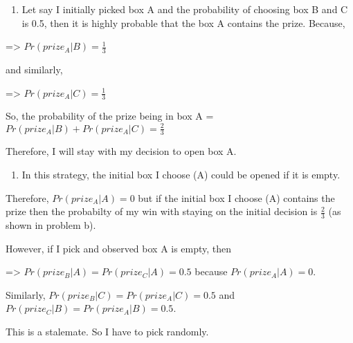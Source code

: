 \documentclass[11pt]{article}
\providecommand{\tightlist}{%
      \setlength{\itemsep}{0pt}\setlength{\parskip}{0pt}}
\begin{document}
\newpage
\begin{enumerate}
\def\labelenumi{\alph{enumi})}
\setcounter{enumi}{1}
\tightlist
\item
  Let say I initially picked box A and the probability of choosing box B
  and C is 0.5, then it is highly probable that the box A contains the
  prize. Because,
\end{enumerate}

=\textgreater{} \(Pr (prize_A | B) = \frac{1}{3}\)

and similarly,

=\textgreater{} \(Pr (prize_A | C) = \frac{1}{3}\)

So, the probability of the prize being in box A =
\(Pr (prize_A | B) + Pr (prize_A | C) = \frac{2}{3}\)

Therefore, I will stay with my decision to open box A.

\begin{enumerate}
\def\labelenumi{\alph{enumi})}
\setcounter{enumi}{2}
\tightlist
\item
  In this strategy, the initial box I choose (A) could be opened if it
  is empty.
\end{enumerate}

Therefore, \(Pr (prize_A | A) = 0\) but if the initial box I choose (A)
contains the prize then the probabilty of my win with staying on the
initial decision is \(\frac{2}{3}\) (as shown in problem b).

However, if I pick and observed box A is empty, then

=\textgreater{} \(Pr (prize_B | A) = Pr (prize_C | A) = 0.5\) because
\(Pr (prize_A | A) = 0\).

Similarly, \(Pr (prize_B | C) = Pr (prize_A | C) = 0.5\) and
\(Pr (prize_C | B) = Pr (prize_A | B) = 0.5\).

This is a stalemate. So I have to pick randomly.


\end{document}
